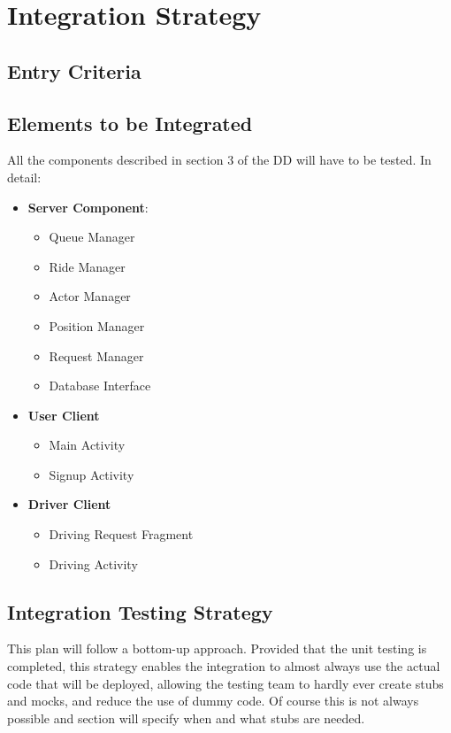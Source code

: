 \section{Integration Strategy} %
\label{sec:integration_strategy}

\subsection{Entry Criteria} %
\label{sub:entry_criteria}

\subsection{Elements to be Integrated} %
\label{sub:elements_to_be_integrated}
All the components described in section 3 of the DD will have to be tested.
In detail:
\begin{itemize}
	\item \textbf{Server Component}:
	\begin{itemize}
		\item Queue Manager
		\item Ride Manager
		\item Actor Manager
		\item Position Manager
		\item Request Manager
		\item Database Interface
	\end{itemize}
	\item \textbf{User Client}
	\begin{itemize}
		\item Main Activity
		\item Signup Activity
	\end{itemize}
	\item \textbf{Driver Client}
	\begin{itemize}
		\item Driving Request Fragment
		\item Driving Activity
	\end{itemize}
\end{itemize}

\subsection{Integration Testing Strategy} %
\label{sub:integration_testing_strategy}
This plan will follow a bottom-up approach. Provided that the unit testing is completed, this strategy enables the integration to almost always use the actual code that will be deployed, allowing the testing team to hardly ever create stubs and mocks, and reduce the use of dummy code.
Of course this is not always possible and section \emph{} will specify when and what stubs are needed.

